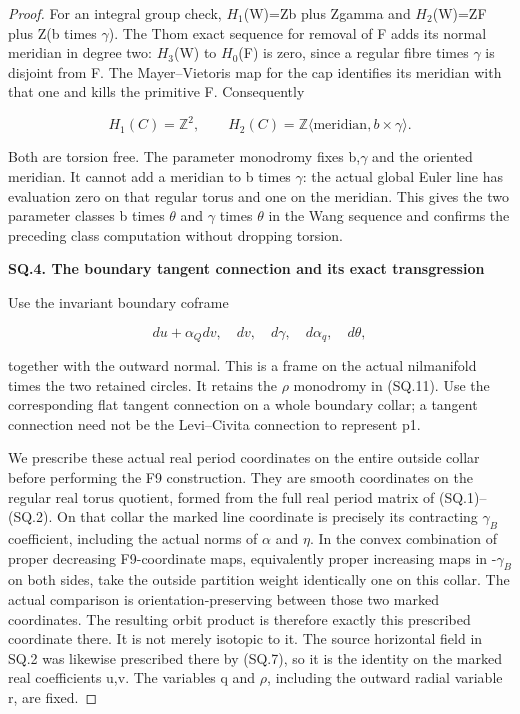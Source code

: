 \begin{proof}
For an integral group check, \(H_{1}\)(W)=Zb plus Zgamma and
\(H_{2}\)(W)=ZF plus Z(b times \(\gamma\)). The Thom exact sequence for removal
of F adds its normal meridian in degree two: \(H_{3}\)(W) to \(H_{0}\)(F) is
zero, since a regular fibre times \(\gamma\) is disjoint from F. The
Mayer--Vietoris map for the cap identifies its meridian with that
one and kills the primitive F. Consequently

\[
 H_1(C)=\mathbb Z^2,\qquad
 H_2(C)=\mathbb Z\langle\text{meridian},b\times\gamma\rangle.
                                                        \tag{SQ.16}
\]

Both are torsion free. The parameter monodromy fixes b,\(\gamma\) and
the oriented meridian. It cannot add a meridian to b times \(\gamma\):
the actual global Euler line has evaluation zero on that regular
torus and one on the meridian. This gives the two parameter classes
b times \(\theta\) and \(\gamma\) times \(\theta\) in the Wang sequence and
confirms the preceding class computation without dropping torsion.

\par

\medskip\noindent\textbf{SQ.4. The boundary tangent connection and its exact transgression}

\par\nobreak

Use the invariant boundary coframe

\[
 du+\alpha_Qdv,\quad dv,\quad d\gamma,\quad
 d\alpha_q,\quad d\theta,
                                                        \tag{SQ.17}
\]

together with the outward normal. This is a frame on the actual
nilmanifold times the two retained circles. It retains the \(\rho\)
monodromy in (SQ.11). Use the corresponding flat tangent connection
on a whole boundary collar; a tangent connection need not be the
Levi--Civita connection to represent p1.

We prescribe these actual real period coordinates on the entire
outside collar before performing the F9 construction. They are smooth
coordinates on the regular real torus quotient, formed from the full
real period matrix of (SQ.1)--(SQ.2). On that collar the marked line coordinate is precisely its
contracting \(\gamma_{B}\) coefficient, including the
actual norms of \(\alpha\) and \(\eta\). In the convex combination of proper decreasing F9-coordinate
maps, equivalently proper increasing maps in -\(\gamma_{B}\) on both sides,
take the outside partition weight identically
one on this collar. The actual comparison is orientation-preserving between those two
marked coordinates. The resulting orbit product is therefore exactly
this prescribed coordinate there. It is not merely isotopic to it.
The source horizontal field in SQ.2 was likewise prescribed there by
(SQ.7), so it is the identity on the marked real coefficients u,v.
The variables q and \(\rho\), including the outward radial variable r,
are fixed.


\end{proof}

